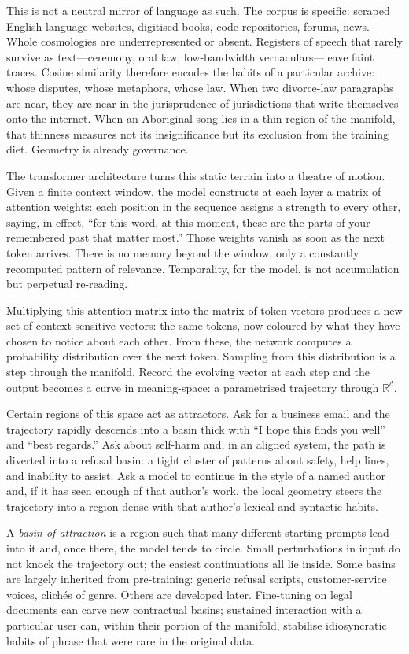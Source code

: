 \documentclass[12pt,a4paper]{article}
\begin{document}
This is not a neutral mirror of language as such. The corpus is specific: scraped English-language websites, digitised books, code repositories, forums, news. Whole cosmologies are underrepresented or absent. Registers of speech that rarely survive as text---ceremony, oral law, low-bandwidth vernaculars---leave faint traces. Cosine similarity therefore encodes the habits of a particular archive: whose disputes, whose metaphors, whose law. When two divorce-law paragraphs are near, they are near in the jurisprudence of jurisdictions that write themselves onto the internet. When an Aboriginal song lies in a thin region of the manifold, that thinness measures not its insignificance but its exclusion from the training diet. Geometry is already governance.

The transformer architecture turns this static terrain into a theatre of motion. Given a finite context window, the model constructs at each layer a matrix of attention weights: each position in the sequence assigns a strength to every other, saying, in effect, ``for this word, at this moment, these are the parts of your remembered past that matter most.'' Those weights vanish as soon as the next token arrives. There is no memory beyond the window, only a constantly recomputed pattern of relevance. Temporality, for the model, is not accumulation but perpetual re-reading.

Multiplying this attention matrix into the matrix of token vectors produces a new set of context-sensitive vectors: the same tokens, now coloured by what they have chosen to notice about each other. From these, the network computes a probability distribution over the next token. Sampling from this distribution is a step through the manifold. Record the evolving vector at each step and the output becomes a curve in meaning-space: a parametrised trajectory through $\mathbb{R}^d$.

Certain regions of this space act as attractors. Ask for a business email and the trajectory rapidly descends into a basin thick with ``I hope this finds you well'' and ``best regards.'' Ask about self-harm and, in an aligned system, the path is diverted into a refusal basin: a tight cluster of patterns about safety, help lines, and inability to assist. Ask a model to continue in the style of a named author and, if it has seen enough of that author's work, the local geometry steers the trajectory into a region dense with that author's lexical and syntactic habits.

A \emph{basin of attraction} is a region such that many different starting prompts lead into it and, once there, the model tends to circle. Small perturbations in input do not knock the trajectory out; the easiest continuations all lie inside. Some basins are largely inherited from pre-training: generic refusal scripts, customer-service voices, clichés of genre. Others are developed later. Fine-tuning on legal documents can carve new contractual basins; sustained interaction with a particular user can, within their portion of the manifold, stabilise idiosyncratic habits of phrase that were rare in the original data.
\end{document}
